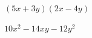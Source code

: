 
\question $(5x + 3y)(2x - 4y)$

  \begin{solutionorlines}[2cm]
    $10x^2 - 14xy - 12y^2$
  \end{solutionorlines}
